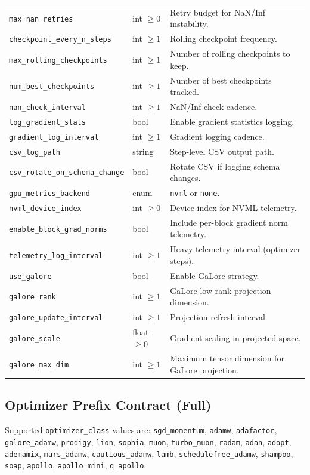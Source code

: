 \documentclass[11pt,a4paper]{article}
\begin{document}
\begin{longtable}{p{5.1cm}p{2.4cm}p{7.0cm}}
\texttt{max\_nan\_retries} & int $\ge 0$ & Retry budget for NaN/Inf instability. \\
\texttt{checkpoint\_every\_n\_steps} & int $\ge 1$ & Rolling checkpoint frequency. \\
\texttt{max\_rolling\_checkpoints} & int $\ge 1$ & Number of rolling checkpoints to keep. \\
\texttt{num\_best\_checkpoints} & int $\ge 1$ & Number of best checkpoints tracked. \\
\texttt{nan\_check\_interval} & int $\ge 1$ & NaN/Inf check cadence. \\
\texttt{log\_gradient\_stats} & bool & Enable gradient statistics logging. \\
\texttt{gradient\_log\_interval} & int $\ge 1$ & Gradient logging cadence. \\
\texttt{csv\_log\_path} & string & Step-level CSV output path. \\
\texttt{csv\_rotate\_on\_schema\_change} & bool & Rotate CSV if logging schema changes. \\
\texttt{gpu\_metrics\_backend} & enum & \texttt{nvml} or \texttt{none}. \\
\texttt{nvml\_device\_index} & int $\ge 0$ & Device index for NVML telemetry. \\
\texttt{enable\_block\_grad\_norms} & bool & Include per-block gradient norm telemetry. \\
\texttt{telemetry\_log\_interval} & int $\ge 1$ & Heavy telemetry interval (optimizer steps). \\
\texttt{use\_galore} & bool & Enable GaLore strategy. \\
\texttt{galore\_rank} & int $\ge 1$ & GaLore low-rank projection dimension. \\
\texttt{galore\_update\_interval} & int $\ge 1$ & Projection refresh interval. \\
\texttt{galore\_scale} & float $\ge 0$ & Gradient scaling in projected space. \\
\texttt{galore\_max\_dim} & int $\ge 1$ & Maximum tensor dimension for GaLore projection. \\
\bottomrule
\end{longtable}
\normalsize

\subsection{Optimizer Prefix Contract (Full)}

Supported \texttt{optimizer\_class} values are:
\texttt{sgd\_momentum}, \texttt{adamw}, \texttt{adafactor}, \texttt{galore\_adamw}, \texttt{prodigy}, \texttt{lion}, \texttt{sophia}, \texttt{muon}, \texttt{turbo\_muon}, \texttt{radam}, \texttt{adan}, \texttt{adopt}, \texttt{ademamix}, \texttt{mars\_adamw}, \texttt{cautious\_adamw}, \texttt{lamb}, \texttt{schedulefree\_adamw}, \texttt{shampoo}, \texttt{soap}, \texttt{apollo}, \texttt{apollo\_mini}, \texttt{q\_apollo}.
\end{document}
